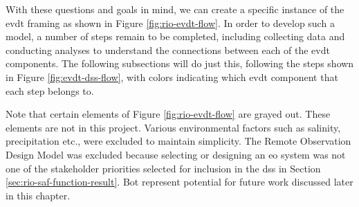 %

With these questions and goals in mind, we can create a specific instance of the \ac{evdt} framing as shown in Figure \ref{fig:rio-evdt-flow}. In order to develop such a model, a number of steps remain to be completed, including collecting data and conducting analyses to understand the connections between each of the \ac{evdt} components. The following subsections will do just this, following the steps shown in Figure \ref{fig:evdt-dss-flow}, with colors indicating which \ac{evdt} component that each step belongs to. 

Note that certain elements of Figure \ref{fig:rio-evdt-flow} are grayed out. These elements are not in this project. Various environmental factors such as salinity, precipitation etc., were excluded to maintain simplicity. The Remote Observation Design Model was excluded because selecting or designing an \ac{eo} system was not one of the stakeholder priorities selected for inclusion in the \ac{dss} in Section \ref{sec:rio-saf-function-result}. Bot represent potential for future work discussed later in this chapter.

